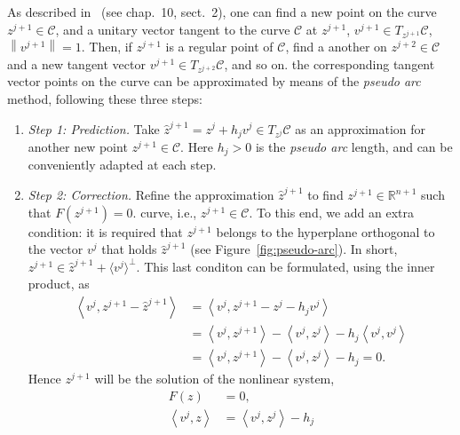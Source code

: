\documentclass[11pt,reqno,twoside]{article}
\newcommand{\R}{\ensuremath{\mathbb{R}}}
\theoremstyle{remark}
\begin{document}
As described in~\cite{Kuznetsov2004} (see chap.~10, sect.~2), one can
find a new point on the curve $z^{j+1}\in\mathcal{C}$, and a unitary
vector tangent to the curve $\mathcal{C}$ at $z^{j+1}$,
$v^{j+1}\in T_{z^{j+1}}\mathcal{C}$, $\left\|v^{j+1}\right\| = 1$.
Then, if $z^{j+1}$ is a
regular point of $\mathcal{C}$, find a another on $z^{j+2}\in\mathcal{C}$
and a new tangent vector $v^{j+1}\in T_{z^{j+2}}\mathcal{C}$, and so on.   
the corresponding tangent vector
points on the curve can be approximated by means of the \emph{pseudo arc} method, following
these three steps:
\begin{enumerate}[label = \emph{\arabic*.}]
  \item \emph{Step 1: Prediction.} Take $\hat{z}^{j+1} = z^{j} + h_{j}
    v^{j}\in T_{z^{j}}\mathcal{C}$ as an approximation for another new
    point $z^{j+1}\in\mathcal{C}$. Here $h_{j} > 0$ is the \emph{pseudo
    arc} length, and can be conveniently adapted at each step.
  \item \emph{Step 2: Correction.} Refine the approximation $\hat{z}^{j+1}$
    to find $z^{j+1}\in\R^{n+1}$ such that $F\left(z^{j+1}\right) = 0$. 
    curve, i.e., $z^{j+1}\in\mathcal{C}$. To this end, we add an 
    extra condition: 
    it is required that $z^{j+1}$ belongs to
    the hyperplane orthogonal to the vector $v^{j}$ that holds
    $\hat{z}^{j+1}$ (see Figure~\ref{fig:pseudo-arc}). In short, $z^{j+1}\in\hat{z}^{j+1} +
    \langle v^{j}\rangle^{\perp}$. This last conditon can be formulated,
    using the inner product, as
    \begin{align*}
      \left\langle v^{j}, z^{j+1} - \hat{z}^{j+1}\right\rangle &=  
      \left\langle v^{j}, z^{j+1} - z^{j} - h_{j} v^{j}\right\rangle \\
      &= \left\langle v^{j}, z^{j+1}\right\rangle -
        \left\langle v^{j}, z^{j}\right\rangle - 
        h_{j} \left\langle v^{j}, v^{j}\right\rangle\\
      &=  \left\langle v^{j}, z^{j+1}\right\rangle -
          \left\langle v^{j}, z^{j}\right\rangle - h_{j} = 0.
    \end{align*}
    Hence $z^{j+1}$ will be the solution of the nonlinear system,
    \begin{displaymath}
      \begin{split}%
        F(z) &= 0,\\
        \left\langle v^{j}, z\right\rangle &= \left\langle v^{j},
        z^{j}\right\rangle - h_{j}
        \end{split}

\end{displaymath}
\end{enumerate}
\end{document}
